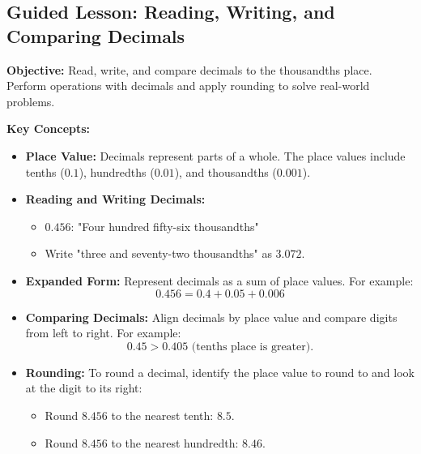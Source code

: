 \documentclass[12pt]{article}
\title{}
\date{}
\begin{document}
\subsection*{Guided Lesson: Reading, Writing, and Comparing Decimals}
\onehalfspacing

\begin{tcolorbox}[colframe=black!40, colback=gray!5, 
coltitle=black, colbacktitle=black!20, fonttitle=\bfseries\Large, 
title=Learning Objective, halign title=center, left=5pt, right=5pt, top=5pt, bottom=15pt]
\textbf{Objective:} Read, write, and compare decimals to the thousandths place. Perform operations with decimals and apply rounding to solve real-world problems.
\end{tcolorbox}

\vspace{1em}

\begin{tcolorbox}[colframe=black!60, colback=white, 
coltitle=black, colbacktitle=black!15, fonttitle=\bfseries\Large, 
title=Key Concepts and Vocabulary, halign title=center, left=10pt, right=10pt, top=10pt, bottom=15pt]
\textbf{Key Concepts:}
\begin{itemize}
    \item \textbf{Place Value:} Decimals represent parts of a whole. The place values include tenths (\(0.1\)), hundredths (\(0.01\)), and thousandths (\(0.001\)).
    \item \textbf{Reading and Writing Decimals:} 
    \begin{itemize}
        \item \(0.456\): "Four hundred fifty-six thousandths"
        \item Write "three and seventy-two thousandths" as \(3.072\).
    \end{itemize}
    \item \textbf{Expanded Form:} Represent decimals as a sum of place values. For example:
    \[ 0.456 = 0.4 + 0.05 + 0.006 \]
    \item \textbf{Comparing Decimals:} Align decimals by place value and compare digits from left to right. For example:
    \[ 0.45 > 0.405 \text{ (tenths place is greater)}. \]
    \item \textbf{Rounding:} To round a decimal, identify the place value to round to and look at the digit to its right:
    \begin{itemize}
        \item Round \(8.456\) to the nearest tenth: \(8.5\).
        \item Round \(8.456\) to the nearest hundredth: \(8.46\).
    \end{itemize}
\end{itemize}
\end{tcolorbox}
\end{document}
